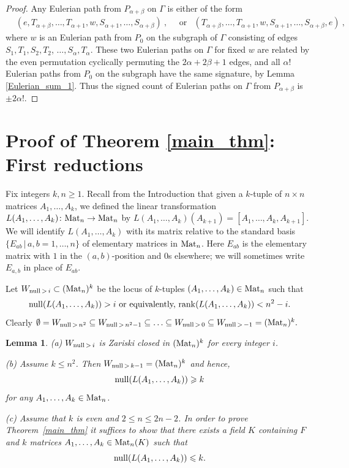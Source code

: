 \documentclass{amsproc}
\newtheorem{lemma}[theorem]{Lemma}
\theoremstyle{definition}
\theoremstyle{remark}
\numberwithin{equation}{section}
\newcommand{\rank}{\operatorname{rank}}
\newcommand{\M}{{\rm Mat}}
\newcommand{\nullity}{{\rm null}}
\begin{document}
\begin{proof}
Any Eulerian path from $P_{\alpha+\beta}$ on $\Gamma$ is either of the form
\begin{align*}
&(e,T_{\alpha+\beta},\dots,T_{\alpha+1},w,S_{\alpha+1},\dots,S_{\alpha+\beta})\ ,\quad \text{ or}
&(T_{\alpha+\beta},\dots,T_{\alpha+1},w,S_{\alpha+1},\dots,S_{\alpha+\beta},e)\ ,
\end{align*}
where $w$ is an Eulerian path from $P_0$ on the subgraph of $\Gamma$ consisting of edges $S_1,T_1,S_2,T_2$, $\dots,S_\alpha,T_\alpha$. These two Eulerian paths on $\Gamma$ for fixed $w$ are related by the even permutation cyclically permuting the $2\alpha+2\beta+1$ edges, and all $\alpha!$ Eulerian paths from $P_0$ on the subgraph have the same signature, by Lemma \ref{Eulerian_sum_1}. Thus the signed count of Eulerian paths on $\Gamma$ from $P_{\alpha+\beta}$ is $\pm 2\alpha!$.
\end{proof}




\section{Proof of Theorem \ref{main_thm}: First reductions}\label{first_reductions}
\label{sect.first-reductions}

Fix integers $k, n \geqslant 1$. %
Recall from the Introduction that given a $k$-tuple of $n \times n$ matrices $A_1, \ldots, A_k$, we defined
the linear transformation
$L(A_1, \ldots, A_k) \colon \M_n \to \M_n$ by $L(A_1, \ldots, A_k)(A_{k+1}) = [A_1, \ldots, A_k, A_{k+1}]$.
We will identify $L(A_1, \ldots, A_k)$ with its matrix relative to the standard basis $ \{ E_{a b} \, | \, a, b = 1, \ldots, n \}$ of elementary matrices in $\M_n$.
Here $E_{a b}$ is the elementary matrix with $1$ in the $(a, b)$-position and $0$s elsewhere; we will sometimes write
$E_{a, b}$ in place of $E_{a b}$.

Let $W_{\nullity \, > \, i} \subset (\M_n)^k$ be the locus of $k$-tuples $(A_1, \dots, A_k) \in \M_n$ such that 
\[ \text{$\nullity(L(A_1, \ldots, A_k))> i$ or equivalently, $\rank(L(A_1, \ldots, A_k)) < n^2 - i$.} \]
Clearly 
$\emptyset = W_{\nullity \, >  \, n^2} \subseteq W_{\nullity \,  > \, n^2 -1} \subseteq \ldots \subseteq W_{\nullity \, > \, 0} \subseteq W_{\nullity \, > \,  -1} = (\M_n)^k.$

\begin{lemma} \label{lem.zariski} (a) $W_{\nullity \, > \, i}$ is Zariski closed in $(\M_n)^k$ for every integer $i$.

\smallskip
(b) Assume $k \leqslant n^2$. Then $W_{\nullity \, > \, k-1} = (\M_n)^k$ and hence, 
\[ \nullity(L(A_1, \ldots, A_k)) \geqslant k \] for any
$A_1, \ldots, A_k \in \M_n$.

\smallskip
(c) Assume that $k$ is even and $2 \leqslant n \leqslant 2n - 2$.
In order to prove Theorem~\ref{main_thm} it suffices to show that there exists a field $K$ containing $F$
and $k$ matrices $A_1, \ldots, A_k \in \M_n(K)$ such that \[ \nullity(L(A_1, \dots, A_k)) \leqslant k . \]
\end{lemma}
\end{document}
